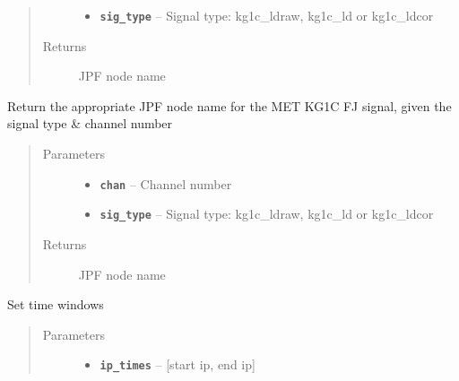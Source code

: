 \documentclass[letterpaper,10pt,english]{sphinxmanual}
\begin{document}
\begin{fulllineitems}
\begin{fulllineitems}
\begin{quote}
\begin{description}
\begin{itemize}
\item {} 
\textbf{\texttt{sig\_type}} -- Signal type: kg1c\_ldraw, kg1c\_ld or kg1c\_ldcor

\end{itemize}

\item[{Returns}] \leavevmode
JPF node name

\end{description}\end{quote}

\end{fulllineitems}


\begin{fulllineitems}
\label{consts:consts.Consts.get_fj_node_met}
Return the appropriate JPF node name for the MET KG1C FJ signal, given the signal type \& channel number
\begin{quote}\begin{description}
\item[{Parameters}] \leavevmode\begin{itemize}
\item {} 
\textbf{\texttt{chan}} -- Channel number

\item {} 
\textbf{\texttt{sig\_type}} -- Signal type: kg1c\_ldraw, kg1c\_ld or kg1c\_ldcor

\end{itemize}

\item[{Returns}] \leavevmode
JPF node name

\end{description}\end{quote}

\end{fulllineitems}


\begin{fulllineitems}
\label{consts:consts.Consts.set_time_windows}
Set time windows
\begin{quote}\begin{description}
\item[{Parameters}] \leavevmode\begin{itemize}
\item {} 
\textbf{\texttt{ip\_times}} -- {[}start ip, end ip{]}


\end{itemize}
\end{description}
\end{quote}
\end{fulllineitems}
\end{fulllineitems}
\end{document}
